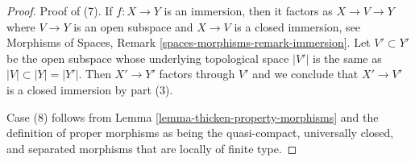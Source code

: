 \documentclass[10pt,a4paper]{amsart}
\theoremstyle{plain}
\theoremstyle{definition}
\theoremstyle{remark}
\numberwithin{equation}{subsection}
\begin{document}
\begin{proof}
\medskip\noindent
Proof of (7). If $f : X \to Y$ is an immersion, then it factors as
$X \to V \to Y$ where $V \to Y$ is an open subspace and $X \to V$ is a
closed immersion, see
Morphisms of Spaces, Remark \ref{spaces-morphisms-remark-immersion}.
Let $V' \subset Y'$ be the open subspace whose
underlying topological space $|V'|$ is the same as $|V| \subset |Y| = |Y'|$.
Then $X' \to Y'$ factors through $V'$ and we conclude that $X' \to V'$
is a closed immersion by part (3).

\medskip\noindent
Case (8) follows from Lemma \ref{lemma-thicken-property-morphisms}
and the definition of proper morphisms as being the quasi-compact,
universally closed, and separated morphisms that are locally of finite type.
\end{proof}
\end{document}
